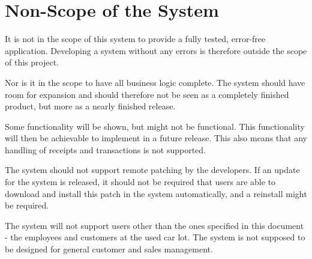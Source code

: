 \section{Non-Scope of the System}
It is not in the scope of this system to provide a fully tested, error-free application. Developing a system without any errors is therefore outside the scope of this project. 

Nor is it in the scope to have all business logic complete. The system should have room for expansion and  should therefore not be seen as a completely finished product, but more as a nearly finished release. 

Some functionality will be shown, but might not be functional. This functionality will then be achievable to implement in a future release. This also means that any handling of receipts and transactions is not supported.

The system should not support remote patching by the developers. If an update for the system is released, it should not be required that users are able to download and install this patch in the system automatically, and a reinstall might be required.

The system will not support users other than the ones specified in this document - the employees and customers at the used car lot. The system is not supposed to be designed for general customer and sales management.